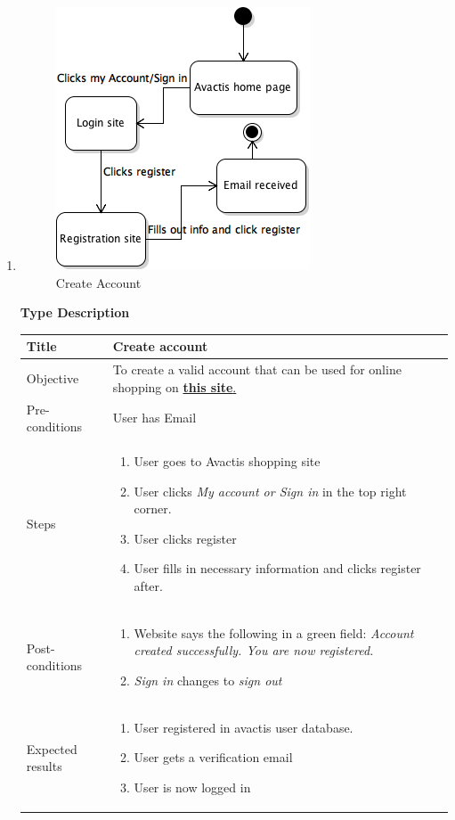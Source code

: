 \documentclass[UKenglish,12pt]{article}
\begin{document}
\begin{enumerate}%
\item
\begin{figure}[!h]
\centering
\includegraphics[scale=0.7,keepaspectratio]{Images/CreateAccount.png}
\caption{Create Account}
\end{figure}
\newpage
\textbf{\hspace{0.3cm}Type\hspace{4.4cm} Description}
\newline \vspace{0.2cm}
\begin{tabular}{| p{5cm} | p{10cm} | }
	\hline
	 Title & Create account\\ \hline
	 Objective & To create a valid account that can be used for online shopping on \href{http://demo.avactis.com/4.7.9/}{\textbf{this site}.} \\ \hline
	 Pre-conditions & User has Email\\ \hline
	 Steps & \begin{enumerate} \item User goes to Avactis shopping site \item User clicks \textit{My account or  Sign in} in the top right corner. \item User clicks register \item User fills in necessary information and clicks register after.\end{enumerate} \\ \hline
	 Post-conditions & \begin{enumerate} \item Website says the following in a green field: \textit{Account created successfully. You are now registered.} \item \textit{Sign in} changes to \textit{sign out} \end{enumerate}\\ \hline
	 Expected results & \begin{enumerate} \item User registered in avactis user database. \item User gets a verification email \item User is now logged in \end{enumerate}\\ 
	 \hline
\end{tabular} %


\end{enumerate}
\end{document}
